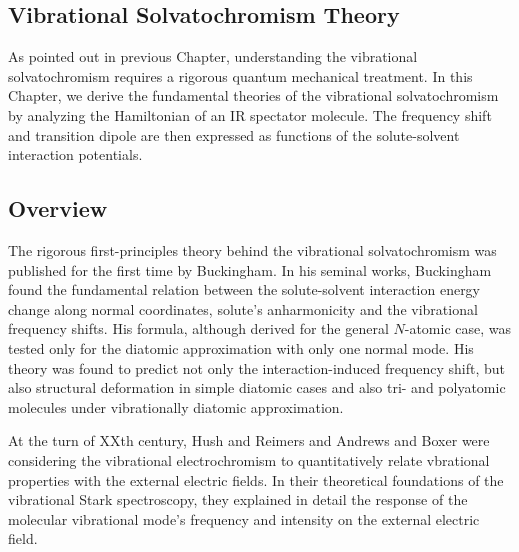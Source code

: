 \documentclass[a4paper,titlepage,twoside,fleqn,12pt]{book}
\begin{document}
\begin{refsection}
\chapter{Vibrational Solvatochromism Theory\label{c:background}}

As pointed out in previous Chapter, understanding the vibrational
solvatochromism requires a rigorous quantum mechanical treatment.
In this Chapter, we derive the fundamental theories of the vibrational
solvatochromism by analyzing the Hamiltonian of an IR spectator molecule.
The frequency shift and transition dipole are then expressed as functions
of the solute\hyp{}solvent interaction potentials.

\section{Overview\label{s:theory}}

The rigorous first\hyp{}principles theory behind the vibrational solvatochromism was published
for the first time by Buckingham.\citep{Buckingham.ProcRSocLondonA.1958,
Buckingham.TransFaradaySoc.1960,Buckingham.ProcRSocLondonA.1960} 
In his seminal works, Buckingham found the fundamental 
relation between the solute\hyp{}solvent interaction energy change along normal 
coordinates, solute's anharmonicity and the vibrational frequency shifts.
His formula, although derived for the general $N$-atomic case, was tested
only for the diatomic approximation with only one normal mode. 
His theory was found to predict not only
the interaction\hyp{}induced frequency shift, but also structural deformation in simple
diatomic cases \citep{McDowell.Buckingham.MolPhys.2005,McDowell.Buckingham.JACS.2005,
McDowell.Buckingham.SpectrChimActaA.2005,Buckingham.CPL.2008} 
and also tri- and polyatomic molecules under 
vibrationally diatomic approximation.\citep{McDowell.Buckingham.SpectrChimActaA.2005,
Buckingham.CPL.2008,Herrebout.Delanoye.vanderVeken.JPCA.2004}

At the turn of XXth century, Hush and Reimers\citep{Hush.Reimers.JPC.1995,Reimers.Zeng.Hush.JPC.1996} 
and Andrews and Boxer\citep{Andrews.Boxer.JPCA.2002,Andrews.Boxer.JPCA.2000} 
were considering the vibrational electrochromism
to quantitatively relate vbrational properties with the external electric fields.
In their theoretical foundations of the vibrational Stark spectroscopy,
they explained in detail the response of the molecular vibrational mode's frequency
and intensity
on the external electric field. 


\end{refsection}
\end{document}
